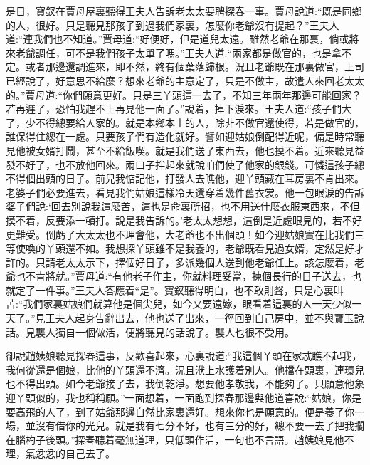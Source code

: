 \begin{parag}
    是日，寶釵在賈母屋裏聽得王夫人告訴老太太要聘探春一事。賈母說道:“既是同鄉的人，很好。只是聽見那孩子到過我們家裏，怎麼你老爺沒有提起？”王夫人道:“連我們也不知道。”賈母道:“好便好，但是道兒太遠。雖然老爺在那裏，倘或將來老爺調任，可不是我們孩子太單了嗎。”王夫人道:“兩家都是做官的，也是拿不定。或者那邊還調進來，即不然，終有個葉落歸根。況且老爺既在那裏做官，上司已經說了，好意思不給麼？想來老爺的主意定了，只是不做主，故遣人來回老太太的。”賈母道:“你們願意更好。只是三丫頭這一去了，不知三年兩年那邊可能回家？若再遲了，恐怕我趕不上再見他一面了。”說着，掉下淚來。王夫人道:“孩子們大了，少不得總要給人家的。就是本鄉本土的人，除非不做官還使得，若是做官的，誰保得住總在一處。只要孩子們有造化就好。譬如迎姑娘倒配得近呢，偏是時常聽見他被女婿打鬧，甚至不給飯喫。就是我們送了東西去，他也摸不着。近來聽見益發不好了，也不放他回來。兩口子拌起來就說咱們使了他家的銀錢。可憐這孩子總不得個出頭的日子。前兒我惦記他，打發人去瞧他，迎丫頭藏在耳房裏不肯出來。老婆子們必要進去，看見我們姑娘這樣冷天還穿着幾件舊衣裳。他一包眼淚的告訴婆子們說:‘回去別說我這麼苦，這也是命裏所招，也不用送什麼衣服東西來，不但摸不着，反要添一頓打。說是我告訴的。’老太太想想，這倒是近處眼見的，若不好更難受。倒虧了大太太也不理會他，大老爺也不出個頭！如今迎姑娘實在比我們三等使喚的丫頭還不如。我想探丫頭雖不是我養的，老爺既看見過女婿，定然是好才許的。只請老太太示下，擇個好日子，多派幾個人送到他老爺任上。該怎麼着，老爺也不肯將就。”賈母道:“有他老子作主，你就料理妥當，揀個長行的日子送去，也就定了一件事。”王夫人答應着“是”。寶釵聽得明白，也不敢則聲，只是心裏叫苦:“我們家裏姑娘們就算他是個尖兒，如今又要遠嫁，眼看着這裏的人一天少似一天了。”見王夫人起身告辭出去，他也送了出來，一徑回到自己房中，並不與寶玉說話。見襲人獨自一個做活，便將聽見的話說了。襲人也很不受用。
\end{parag}


\begin{parag}
    卻說趙姨娘聽見探春這事，反歡喜起來，心裏說道:“我這個丫頭在家忒瞧不起我，我何從還是個娘，比他的丫頭還不濟。況且洑上水護着別人。他擋在頭裏，連環兒也不得出頭。如今老爺接了去，我倒乾淨。想要他孝敬我，不能夠了。只願意他象迎丫頭似的，我也稱稱願。”一面想着，一面跑到探春那邊與他道喜說:“姑娘，你是要高飛的人了，到了姑爺那邊自然比家裏還好。想來你也是願意的。便是養了你一場，並沒有借你的光兒。就是我有七分不好，也有三分的好，總不要一去了把我擱在腦杓子後頭。”探春聽着毫無道理，只低頭作活，一句也不言語。趙姨娘見他不理，氣忿忿的自己去了。
\end{parag}


